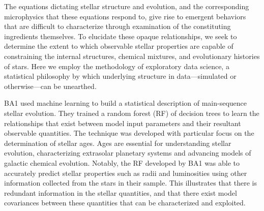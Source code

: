 The equations dictating stellar structure and evolution, and the corresponding microphysics that these equations respond to, give rise to emergent behaviors that are difficult to characterize through examination of the constituting ingredients themselves. To elucidate these opaque relationships, we seek to determine the extent to which observable stellar properties are capable of constraining the internal structures, chemical mixtures, and evolutionary histories of stars. Here we employ the methodology of exploratory data science, a statistical philosophy by which underlying structure in data---simulated or otherwise---can be unearthed.



BA1 used machine learning to build a statistical description of main-sequence stellar evolution. They trained a random forest (RF) of decision trees to learn the relationships that exist between model input parameters and their resultant observable quantities. The technique was developed with particular focus on the determination of stellar ages.  Ages are essential for understanding stellar evolution, characterizing extrasolar planetary systems and advancing models of galactic chemical evolution. 
Notably, the RF developed by BA1 was able to accurately predict stellar properties such as radii and luminosities using other information collected from the stars in their sample. This illustrates that there is redundant information in the stellar quantities, and that there exist model covariances between these quantities that can be characterized and exploited. 



